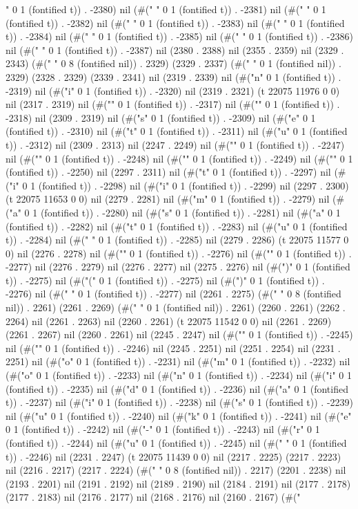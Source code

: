 {{" 0 1 (fontified t)) . -2380) nil (#(" " 0 1 (fontified t)) . -2381) nil (#(" " 0 1 (fontified t)) . -2382) nil (#(" " 0 1 (fontified t)) . -2383) nil (#(" " 0 1 (fontified t)) . -2384) nil (#(" " 0 1 (fontified t)) . -2385) nil (#(" " 0 1 (fontified t)) . -2386) nil (#(" " 0 1 (fontified t)) . -2387) nil (2380 . 2388) nil (2355 . 2359) nil (2329 . 2343) (#("        " 0 8 (fontified nil)) . 2329) (2329 . 2337) (#(" " 0 1 (fontified nil)) . 2329) (2328 . 2329) (2339 . 2341) nil (2319 . 2339) nil (#("n" 0 1 (fontified t)) . -2319) nil (#("i" 0 1 (fontified t)) . -2320) nil (2319 . 2321) (t 22075 11976 0 0) nil (2317 . 2319) nil (#("" 0 1 (fontified t)) . -2317) nil (#("" 0 1 (fontified t)) . -2318) nil (2309 . 2319) nil (#("s" 0 1 (fontified t)) . -2309) nil (#("e" 0 1 (fontified t)) . -2310) nil (#("t" 0 1 (fontified t)) . -2311) nil (#("u" 0 1 (fontified t)) . -2312) nil (2309 . 2313) nil (2247 . 2249) nil (#("" 0 1 (fontified t)) . -2247) nil (#("" 0 1 (fontified t)) . -2248) nil (#("" 0 1 (fontified t)) . -2249) nil (#("" 0 1 (fontified t)) . -2250) nil (2297 . 2311) nil (#("t" 0 1 (fontified t)) . -2297) nil (#("i" 0 1 (fontified t)) . -2298) nil (#("i" 0 1 (fontified t)) . -2299) nil (2297 . 2300) (t 22075 11653 0 0) nil (2279 . 2281) nil (#("m" 0 1 (fontified t)) . -2279) nil (#("a" 0 1 (fontified t)) . -2280) nil (#("s" 0 1 (fontified t)) . -2281) nil (#("a" 0 1 (fontified t)) . -2282) nil (#("t" 0 1 (fontified t)) . -2283) nil (#("u" 0 1 (fontified t)) . -2284) nil (#(" " 0 1 (fontified t)) . -2285) nil (2279 . 2286) (t 22075 11577 0 0) nil (2276 . 2278) nil (#("" 0 1 (fontified t)) . -2276) nil (#("" 0 1 (fontified t)) . -2277) nil (2276 . 2279) nil (2276 . 2277) nil (2275 . 2276) nil (#(")" 0 1 (fontified t)) . -2275) nil (#("(" 0 1 (fontified t)) . -2275) nil (#(")" 0 1 (fontified t)) . -2276) nil (#(" " 0 1 (fontified t)) . -2277) nil (2261 . 2275) (#("        " 0 8 (fontified nil)) . 2261) (2261 . 2269) (#(" " 0 1 (fontified nil)) . 2261) (2260 . 2261) (2262 . 2264) nil (2261 . 2263) nil (2260 . 2261) (t 22075 11542 0 0) nil (2261 . 2269) (2261 . 2267) nil (2260 . 2261) nil (2245 . 2247) nil (#("" 0 1 (fontified t)) . -2245) nil (#("" 0 1 (fontified t)) . -2246) nil (2245 . 2251) nil (2251 . 2254) nil (2231 . 2251) nil (#("o" 0 1 (fontified t)) . -2231) nil (#("m" 0 1 (fontified t)) . -2232) nil (#("o" 0 1 (fontified t)) . -2233) nil (#("n" 0 1 (fontified t)) . -2234) nil (#("i" 0 1 (fontified t)) . -2235) nil (#("d" 0 1 (fontified t)) . -2236) nil (#("a" 0 1 (fontified t)) . -2237) nil (#("i" 0 1 (fontified t)) . -2238) nil (#("s" 0 1 (fontified t)) . -2239) nil (#("u" 0 1 (fontified t)) . -2240) nil (#("k" 0 1 (fontified t)) . -2241) nil (#("e" 0 1 (fontified t)) . -2242) nil (#("-" 0 1 (fontified t)) . -2243) nil (#("r" 0 1 (fontified t)) . -2244) nil (#("u" 0 1 (fontified t)) . -2245) nil (#(" " 0 1 (fontified t)) . -2246) nil (2231 . 2247) (t 22075 11439 0 0) nil (2217 . 2225) (2217 . 2223) nil (2216 . 2217) (2217 . 2224) (#("        " 0 8 (fontified nil)) . 2217) (2201 . 2238) nil (2193 . 2201) nil (2191 . 2192) nil (2189 . 2190) nil (2184 . 2191) nil (2177 . 2178) (2177 . 2183) nil (2176 . 2177) nil (2168 . 2176) nil (2160 . 2167) (#(" }}
